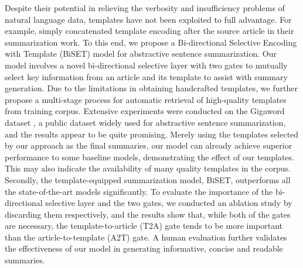 \documentclass[11pt,a4paper]{article}
\begin{document}
Despite their potential in relieving the verbosity and insufficiency problems of natural language data, templates have not been exploited to full advantage. For example,  simply concatenated template encoding after the source article in their summarization work. To this end, we propose a Bi-directional Selective Encoding with Template (BiSET) model for abstractive sentence summarization. Our model involves a novel bi-directional selective layer with two gates to mutually select key information from an article and its template to assist with summary generation. Due to the limitations in obtaining handcrafted templates, we further propose a multi-stage process for automatic retrieval of high-quality templates from training corpus. Extensive experiments were conducted on the Gigaword dataset \cite{Rush2015A}, a public dataset widely used for abstractive sentence summarization, and the results appear to be quite promising. Merely using the templates selected by our approach as the final summaries, our model can already achieve superior performance to some baseline models, demonstrating the effect of our templates. This may also indicate the availability of many quality templates in the corpus. Secondly, the template-equipped summarization model, BiSET, outperforms all the state-of-the-art models significantly. To evaluate the importance of the bi-directional selective layer and the two gates, we conducted an ablation study by discarding them respectively, and the results show that, while both of the gates are necessary, the template-to-article (T2A) gate tends to be more important than the article-to-template (A2T) gate. A human evaluation further validates the effectiveness of our model in generating informative, concise and readable summaries.
\end{document}
